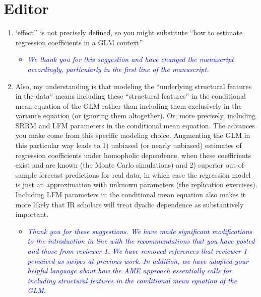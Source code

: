 \section*{Editor}

\begin{enumerate}
	\item `effect'' is not precisely defined, so you might substitute ``how to estimate regression coefficients in a GLM context''
	\begin{itemize}
		\item \textcolor{blue}{ \emph{
		We thank you for this suggestion and have changed the manuscript accordingly, particularly in the first line of the manuscript.}}
	\end{itemize}
	\item Also, my understanding is that modeling the ``underlying structural features in the data'' means including these ``structural features'' in the conditional mean equation of the GLM rather than including them exclusively in the variance equation (or ignoring them altogether). Or, more precisely, including SRRM and LFM parameters in the conditional mean equation. The advances you make come from this specific modeling choice. Augmenting the GLM in this particular way leads to 1) unbiased (or nearly unbiased) estimates of regression coefficients under homopholic dependence, when these coefficients exist and are known (the Monte Carlo simulations) and 2) superior out-of-sample forecast predictions for real data, in which case the regression model is just an approximation with unknown parameters (the replication exercises). Including LFM parameters in the conditional mean equation also makes it more likely that IR scholars will treat dyadic dependence as substantively important.
	\begin{itemize}
		\item \textcolor{blue}{ \emph{
			Thank you for these suggestions. We have made significant modifications to the introduction in line with the recommendations that you have posted and those from reviewer 1. We have removed references that reviewer 1 perceived as swipes at previous work. In addition, we have adopted your helpful language about how the AME approach essentially calls for including structural features in the conditional mean equation of the GLM. 
			}}
	\end{itemize}
\end{enumerate}
